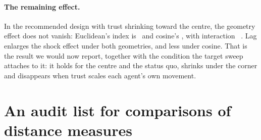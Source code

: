\documentclass[11pt]{article}
\begin{document}
\paragraph{The remaining effect.}
In the recommended design with trust shrinking toward the centre, the geometry effect does not vanish: Euclidean's index is \VCRecommendedEucIdx\ and cosine's \VCRecommendedCosIdx, with interaction \VCRecommendedInter\ \VCRecommendedCI.
Lag enlarges the shock effect under both geometries, and less under cosine.
That is the result we would now report, together with the condition the target sweep attaches to it: it holds for the centre and the status quo, shrinks under the corner and disappears when trust scales each agent's own movement.

\section{An audit list for comparisons of distance measures}
\label{sec:protocol}
\end{document}
